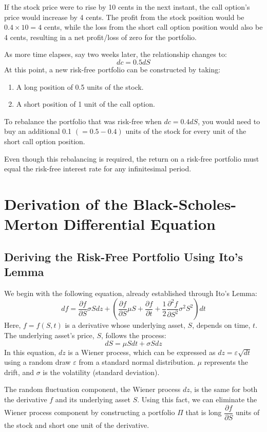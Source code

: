 \documentclass[uplatex]{jsarticle}
\begin{document}
If the stock price were to rise by 10 cents in the next instant, the call option's price would increase by 4 cents. The profit from the stock position would be $0.4 \times 10 = 4$ cents, while the loss from the short call option position would also be 4 cents, resulting in a net profit/loss of zero for the portfolio.

As more time elapses, say two weeks later, the relationship changes to:
$$
	dc = 0.5 dS
$$
At this point, a new risk-free portfolio can be constructed by taking:
\begin{enumerate}
	\item A long position of 0.5 units of the stock.
	\item A short position of 1 unit of the call option.
\end{enumerate}
To rebalance the portfolio that was risk-free when $dc = 0.4 dS$, you would need to buy an additional 0.1 $(=0.5-0.4)$ units of the stock for every unit of the short call option position.

Even though this rebalancing is required, the return on a risk-free portfolio must equal the risk-free interest rate for any infinitesimal period.

\section{Derivation of the Black-Scholes-Merton Differential Equation}

\subsection{Deriving the Risk-Free Portfolio Using Ito's Lemma}

We begin with the following equation, already established through Ito's Lemma:
$$
	df = \dfrac{\partial f}{\partial S} \sigma S dz + \left( \dfrac{\partial f}{\partial S} \mu S + \dfrac{\partial f}{\partial t} + \dfrac{1}{2} \dfrac{\partial^{2} f}{\partial S^{2}} \sigma^{2} S^{2} \right) dt
$$
Here, $f=f(S,t)$ is a derivative whose underlying asset, $S$, depends on time, $t$. The underlying asset's price, $S$, follows the process:
$$
	dS = \mu S dt + \sigma S dz
$$
In this equation, $dz$ is a Wiener process, which can be expressed as $dz = \varepsilon \sqrt{dt}$ using a random draw $\varepsilon$ from a standard normal distribution. $\mu$ represents the drift, and $\sigma$ is the volatility (standard deviation).

\bigskip

The random fluctuation component, the Wiener process $dz$, is the same for both the derivative $f$ and its underlying asset $S$. Using this fact, we can eliminate the Wiener process component by constructing a portfolio $\Pi$ that is long $\dfrac{\partial f}{\partial S}$ units of the stock and short one unit of the derivative.
\end{document}
